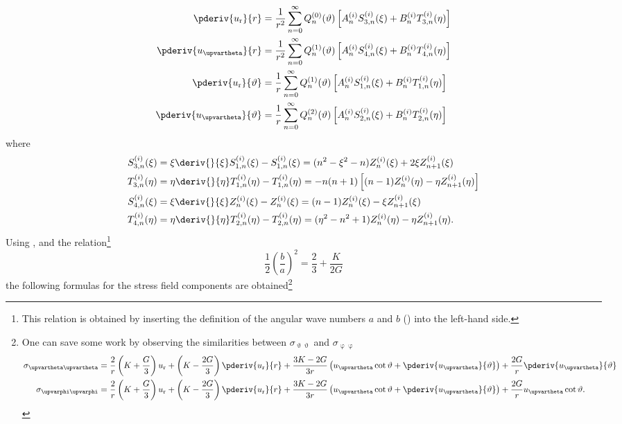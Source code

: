 \begin{align}
	\pderiv{u_{\mathrm{r}}}{r} &= \frac{1}{r^2}\sum_{n=0}^\infty Q_n^{(0)}(\vartheta)\left[A_n^{(i)}S_{3,n}^{(i)}(\xi)+B_n^{(i)}T_{3,n}^{(i)}(\eta)\right]\\
	\pderiv{u_{\upvartheta}}{r} &= \frac{1}{r^2}\sum_{n=0}^\infty Q_n^{(1)}(\vartheta)\left[A_n^{(i)}S_{4,n}^{(i)}(\xi)+B_n^{(i)}T_{4,n}^{(i)}(\eta)\right]\\
	\pderiv{u_{\mathrm{r}}}{\vartheta} &= \frac{1}{r}\sum_{n=0}^\infty Q_n^{(1)}(\vartheta)\left[A_n^{(i)}S_{1,n}^{(i)}(\xi)+B_n^{(i)}T_{1,n}^{(i)}(\eta)\right]\\
	\pderiv{u_\upvartheta}{\vartheta} &= \frac{1}{r}\sum_{n=0}^\infty Q_n^{(2)}(\vartheta)\left[A_n^{(i)}S_{2,n}^{(i)}(\xi)+B_n^{(i)}T_{2,n}^{(i)}(\eta)\right]
\end{align}
where
\begin{align*}
	S_{3,n}^{(i)}(\xi) &= \xi \deriv{}{\xi}S_{1,n}^{(i)}(\xi) - S_{1,n}^{(i)}(\xi) =  (n^2-\xi^2-n)Z_n^{(i)}(\xi) + 2\xi Z_{n+1}^{(i)}(\xi)\\ 
	T_{3,n}^{(i)}(\eta) &= \eta \deriv{}{\eta}T_{1,n}^{(i)}(\eta) -T_{1,n}^{(i)}(\eta) = -n(n+1)\left[(n-1)Z_n^{(i)}(\eta) - \eta Z_{n+1}^{(i)}(\eta)\right]\\
	S_{4,n}^{(i)}(\xi) &= \xi \deriv{}{\xi}Z_n^{(i)}(\xi) - Z_n^{(i)}(\xi) = (n-1)Z_n^{(i)}(\xi)-\xi Z_{n+1}^{(i)}(\xi)\\ 
	T_{4,n}^{(i)}(\eta) &= \eta\deriv{}{\eta}T_{2,n}^{(i)}(\eta) - T_{2,n}^{(i)}(\eta) = (\eta^2-n^2+1)Z_n^{(i)}(\eta) -\eta Z_{n+1}^{(i)}(\eta).
\end{align*}
Using , and the relation\footnote{This relation is obtained by inserting the definition of the angular wave numbers $a$ and $b$ () into the left-hand side.}
\begin{equation}
	\frac{1}{2}\left(\frac{b}{a}\right)^2 = \frac23+\frac{K}{2G}
\end{equation}
the following formulas for the stress field components are obtained\footnote{One can save some work by observing the similarities between $\sigma_{\upvartheta\upvartheta}$ and $\sigma_{\upvarphi\upvarphi}$
\begin{align*}
	\sigma_{\upvartheta\upvartheta} &= \frac{2}{r}\left(K+\frac{G}{3}\right)u_{\mathrm{r}} + \left(K-\frac{2G}{3}\right)\pderiv{u_{\mathrm{r}}}{r} + \frac{3K-2G}{3r}\left(u_\upvartheta\cot\vartheta + \pderiv{u_\upvartheta}{\vartheta}\right) + \frac{2G}{r}\pderiv{u_\upvartheta}{\vartheta}\\
	\sigma_{\upvarphi\upvarphi} &= \frac{2}{r}\left(K+\frac{G}{3}\right)u_{\mathrm{r}} + \left(K-\frac{2G}{3}\right)\pderiv{u_{\mathrm{r}}}{r} + \frac{3K-2G}{3r}\left(u_\upvartheta\cot\vartheta + \pderiv{u_\upvartheta}{\vartheta}\right) + \frac{2G}{r} u_\upvartheta\cot\vartheta.
\end{align*}}
